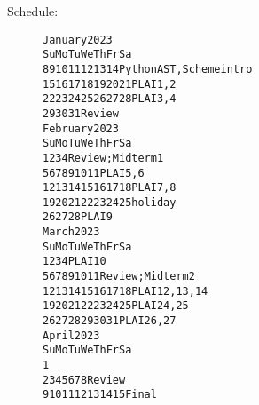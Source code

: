 \documentclass{article}
\newcommand{\myitem}[1]{\item[#1]}
\begin{document}
\begin{description}
\newpage
\myitem{Schedule:}
\begin{alltt} \large
    January 2023
Su Mo Tu We Th Fr Sa
 8  9 10 11 12 13 14  Python AST, Scheme intro
15 {\color{red}16} 17 18 19 20 21  PLAI 1,2
22 23 24 25 26 27 28  PLAI 3,4
29 30 31              Review
    February 2023
Su Mo Tu We Th Fr Sa
          1  2  3  4  Review; Midterm 1
 5  6  7  8  9 10 11  PLAI 5,6
12 13 14 15 16 17 18  PLAI 7,8
19 {\color{red}20 21 22 23 24} 25  holiday
26 27 28              PLAI 9
     March 2023
Su Mo Tu We Th Fr Sa
          1  2  3  4  PLAI 10
 5  6  7  8  9 10 11  Review; Midterm 2
12 13 14 15 16 17 18  PLAI 12,13,14
19 20 21 22 23 24 25  PLAI 24, 25
26 27 28 29 30 31     PLAI 26, 27
     April 2023
Su Mo Tu We Th Fr Sa
                   1
 2  3  4  5  6  7  8  Review
 9 {\color{red}10 11 12 13 14} 15  Final
\end{alltt}


\end{description}
\end{document}
